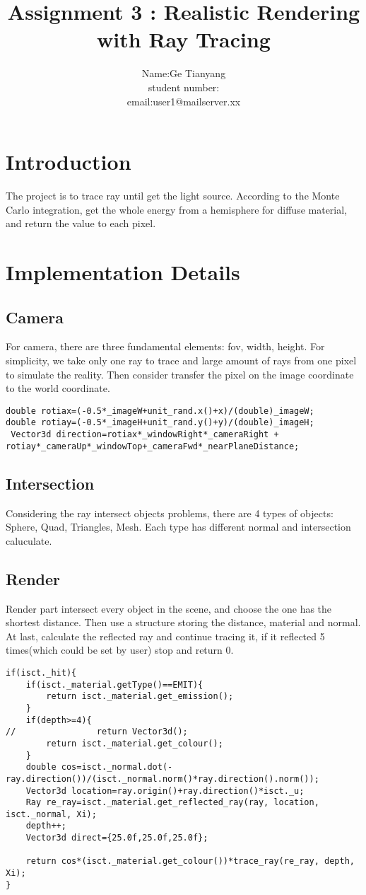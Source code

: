 \documentclass[acmtog]{acmart}
\title{Assignment 3 : Realistic Rendering with Ray Tracing}
\author{Name:\quad Ge Tianyang  \\ student number:\quad 27869265
	\\email:\quad user1@mailserver.xx}
\begin{document}
\maketitle

\vspace*{2 ex}


\section{Introduction}
The project is to trace ray until get the light source. According to the Monte Carlo integration, get the whole energy from a hemisphere for diffuse material, and return the value to each pixel.
\section{Implementation Details}
\subsection{Camera} For camera, there are three fundamental elements: fov, width, height. For simplicity, we take only one ray to trace and large amount of rays from one pixel to simulate the reality. Then consider transfer the pixel on the image coordinate to the world coordinate.\\
\begin{lstlisting}
double rotiax=(-0.5*_imageW+unit_rand.x()+x)/(double)_imageW;
double rotiay=(-0.5*_imageH+unit_rand.y()+y)/(double)_imageH;
 Vector3d direction=rotiax*_windowRight*_cameraRight + rotiay*_cameraUp*_windowTop+_cameraFwd*_nearPlaneDistance;
\end{lstlisting}
\subsection{Intersection} Considering the ray intersect objects problems, there are 4 types of objects: Sphere, Quad, Triangles, Mesh. Each type has different normal and intersection caluculate. 
\subsection{Render} Render part intersect every object in the scene, and choose the one has the shortest distance. Then use a structure storing the distance, material and normal. At last, calculate the reflected ray and continue tracing it, if it reflected 5 times(which could be set by user) stop and return 0.
\begin{lstlisting}
if(isct._hit){
    if(isct._material.getType()==EMIT){
        return isct._material.get_emission();
    }
    if(depth>=4){
//                return Vector3d();
        return isct._material.get_colour();
    }
    double cos=isct._normal.dot(-ray.direction())/(isct._normal.norm()*ray.direction().norm());
    Vector3d location=ray.origin()+ray.direction()*isct._u;
    Ray re_ray=isct._material.get_reflected_ray(ray, location, isct._normal, Xi);
    depth++;
    Vector3d direct={25.0f,25.0f,25.0f};

    return cos*(isct._material.get_colour())*trace_ray(re_ray, depth, Xi);
}
\end{lstlisting} 
\end{document}
